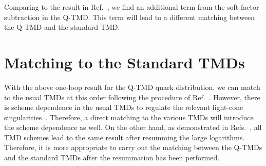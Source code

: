 \documentclass[aps,prd,preprint,tightenlines,superscriptaddress,nofootinbib]{revtex4}
\begin{document}
Comparing to the result in Ref.~\cite{Ji:2014hxa}, we find an additional term 
from the soft factor subtraction in the Q-TMD. This term will lead to 
a different matching between the Q-TMD and the standard TMD.

\section{Matching to the Standard TMDs}

With the above one-loop result for the Q-TMD quark distribution, we can
match to the usual TMDs at this order following the procedure of Ref.~\cite{Ji:2013dva}.
However, there is scheme dependence in the usual TMDs to regulate
the relevant light-cone singularities~\cite{Collins}. Therefore, a direct matching 
to the various TMDs will introduce the scheme dependence as well.
On the other hand, as demonstrated in 
Refs.~\cite{Catani:2000vq,Catani:2013tia,Prokudin:2015ysa}, all TMD schemes
lead to the same result after resumming the large logarithms. Therefore,
it is more appropriate to carry out the matching between the Q-TMDs
and the standard TMDs after the resummation has been performed.
\end{document}
